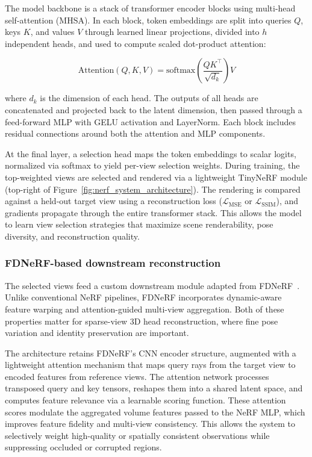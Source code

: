 \documentclass[9pt,openany]{extbook}
\begin{document}
The model backbone is a stack of transformer encoder blocks using multi-head self-attention (MHSA). In each block, token embeddings are split into queries $Q$, keys $K$, and values $V$ through learned linear projections, divided into $h$ independent heads, and used to compute scaled dot-product attention:

\begin{equation}
    \text{Attention}(Q, K, V) = \text{softmax}\left(\frac{QK^\top}{\sqrt{d_k}}\right) V
\end{equation}

\noindent where $d_k$ is the dimension of each head. The outputs of all heads are concatenated and projected back to the latent dimension, then passed through a feed-forward MLP with GELU activation and LayerNorm. Each block includes residual connections around both the attention and MLP components.

At the final layer, a selection head maps the token embeddings to scalar logits, normalized via softmax to yield per-view selection weights. During training, the top-weighted views are selected and rendered via a lightweight TinyNeRF module (top-right of Figure~\ref{fig:nerf_system_architecture}). The rendering is compared against a held-out target view using a reconstruction loss ($\mathcal{L}_{\text{MSE}}$ or $\mathcal{L}_{\text{SSIM}}$), and gradients propagate through the entire transformer stack. This allows the model to learn view selection strategies that maximize scene renderability, pose diversity, and reconstruction quality.


\subsubsection{FDNeRF-based downstream reconstruction}
\label{sec:fdnerf}

The selected views feed a custom downstream module adapted from FDNeRF~\cite{zhang2022fdnerf}. Unlike conventional NeRF pipelines, FDNeRF incorporates dynamic-aware feature warping and attention-guided multi-view aggregation. Both of these properties matter for sparse-view 3D head reconstruction, where fine pose variation and identity preservation are important.

The architecture retains FDNeRF's CNN encoder structure, augmented with a lightweight attention mechanism that maps query rays from the target view to encoded features from reference views. The attention network processes transposed query and key tensors, reshapes them into a shared latent space, and computes feature relevance via a learnable scoring function. These attention scores modulate the aggregated volume features passed to the NeRF MLP, which improves feature fidelity and multi-view consistency. This allows the system to selectively weight high-quality or spatially consistent observations while suppressing occluded or corrupted regions.
\end{document}
